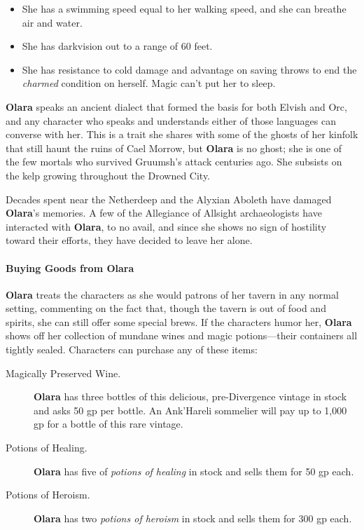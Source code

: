 \documentclass[letterpaper, 11pt, bg=full, twocolumn]{dndbook}
\begin{document}
\begin{itemize}
\item She has a swimming speed equal to her walking speed, and she can breathe air and water.
\item She has darkvision out to a range of 60 feet.
\item She has resistance to cold damage and advantage on saving throws to end the \textit{charmed} condition on herself. Magic can't put her to sleep.
\end{itemize}

\textbf{Olara} speaks an ancient dialect that formed the basis for both Elvish and Orc, and any character who speaks and understands either of those languages can converse with her. This is a trait she shares with some of the ghosts of her kinfolk that still haunt the ruins of Cael Morrow, but \textbf{Olara} is no ghost; she is one of the few mortals who survived Gruumsh's attack centuries ago. She subsists on the kelp growing throughout the Drowned City.

Decades spent near the Netherdeep and the Alyxian Aboleth have damaged \textbf{Olara}'s memories. A few of the Allegiance of Allsight archaeologists have interacted with \textbf{Olara}, to no avail, and since she shows no sign of hostility toward their efforts, they have decided to leave her alone.

\paragraph{Buying Goods from Olara}

\textbf{Olara} treats the characters as she would patrons of her tavern in any normal setting, commenting on the fact that, though the tavern is out of food and spirits, she can still offer some special brews. If the characters humor her, \textbf{Olara} shows off her collection of mundane wines and magic potions---their containers all tightly sealed. Characters can purchase any of these items:

\begin{description}
\item[Magically Preserved Wine.] \textbf{Olara} has three bottles of this delicious, pre-Divergence vintage in stock and asks 50 gp per bottle. An Ank'Hareli sommelier will pay up to 1,000 gp for a bottle of this rare vintage.
\item[Potions of Healing.] \textbf{Olara} has five of \textit{potions of healing} in stock and sells them for 50 gp each.
\item[Potions of Heroism.] \textbf{Olara} has two \textit{potions of heroism} in stock and sells them for 300 gp each.
\end{description}
\end{document}
